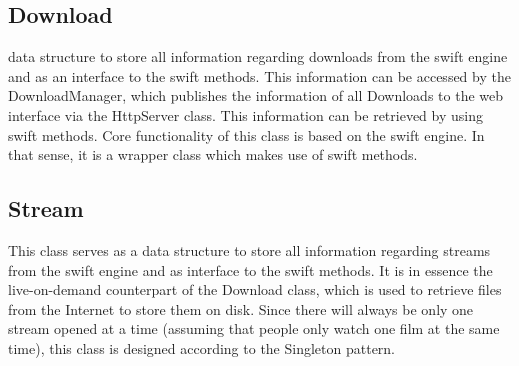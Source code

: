 \begin{center}
\begin{figure}[h!]
{}
\end{figure}
\end{center}

\subsection{Download}
data structure to store all information regarding downloads from the swift engine and as an interface to the swift methods.
This information can be accessed by the DownloadManager, which publishes the information of all Downloads to the web interface via
the HttpServer class. This information can be retrieved by using swift methods. Core functionality of this class is based on the swift engine.
In that sense, it is a wrapper class which makes use of swift methods.

\subsection{Stream}
This class serves as a data structure to store all information regarding streams from the swift engine and as interface to the swift methods. It is in
essence the live-on-demand counterpart of the Download class, which is used to retrieve files from the Internet to store them on disk.
Since there will always be only one stream opened at a time (assuming that people only watch one film at the same time),
this class is designed according to the Singleton pattern.


